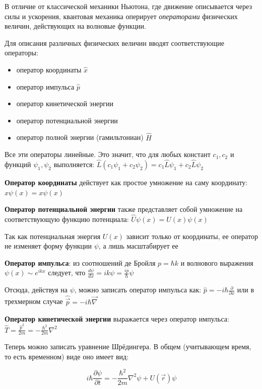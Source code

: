 \documentclass[12pt]{article}
\begin{document}
В отличие от классической механики Ньютона, где движение описывается через силы и ускорения, квантовая механика оперирует \textit{операторами} физических величин, действующих на волновые функции.  

Для описания различных физических величин вводят соответствующие операторы:

\begin{itemize}
    \item оператор координаты $\hat{x}$
    \item оператор импульса $\hat{p}$
    \item оператор кинетической энергии
    \item оператор потенциальной энергии
    \item оператор полной энергии (гамильтониан) $\hat{H}$
\end{itemize}

Все эти операторы линейные. Это значит, что для любых констант $c_1, c_2$ и функций $\psi_1, \psi_2$ выполняется: $\hat{L}(c_1 \psi_1 + c_2 \psi_2) = c_1 \hat{L}\psi_1 + c_2 \hat{L}\psi_2$


\textbf{Оператор координаты} действует как простое умножение на саму координату: $\hat{x}\psi(x) = x\psi(x)$

\textbf{Оператор потенциальной энергии} также представляет собой умножение на соответствующую функцию потенциала: $\hat{U}\psi(x) = U(x)\psi(x)$

Так как потенциальная энергия $U(x)$ зависит только от координаты, ее оператор не изменяет форму функции $\psi$, а лишь масштабирует ее

\textbf{Оператор импульса}: из соотношений де Бройля $p = \hbar k$ и волнового выражения $\psi(x) \sim e^{ikx}$ следует, что $\frac{d\psi}{dx} = i k \psi = \frac{i p}{\hbar}\psi$

Отсюда, действуя на $\psi$, можно записать оператор импульса как: $\hat{p} = - i \hbar \frac{\partial}{\partial x}$ или в трехмерном случае $\hat{\vec{p}} = - i \hbar \vec{\nabla}$

\textbf{Оператор кинетической энергии} выражается через оператор импульса: $\hat{T} = \frac{\hat{p}^2}{2m} = -\frac{\hbar^2}{2m}\nabla^2$

\mediumvspace

Теперь можно записать уравнение Шрёдингера. В общем (учитывающем время, то есть временном) виде оно имеет вид:

\[
i\hbar \frac{\partial \psi}{\partial t} = -\frac{\hbar^2}{2m}\nabla^2 \psi + U(\vec r)\psi
\]
\end{document}
